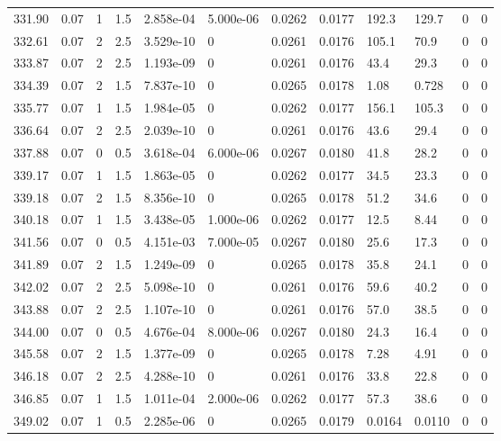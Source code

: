 \documentclass[preview]{standalone}
\begin{document}
{{{{{{\begin{tabular}{L{1.2cm}C{1.2cm} C{0.3cm}C{0.5cm} C{1.4cm}C{1.4cm} C{1.4cm}C{1.4cm} C{1.6cm}C{1.6cm} C{1.6cm}C{1.6cm}}
  331.90  &  0.07  & 1     & 1.5 &  2.858e-04  & 5.000e-06  &  0.0262&   0.0177& 192.3 & 129.7   &  0 & 0  \\ 
  332.61  &  0.07  & 2     & 2.5 &  3.529e-10  & 0  &  0.0261&   0.0176& 105.1 & 70.9   &  0 & 0  \\ 
  333.87  &  0.07  & 2     & 2.5 &  1.193e-09  & 0  &  0.0261&   0.0176& 43.4 & 29.3   &  0 & 0  \\ 
  334.39  &  0.07  & 2     & 1.5 &  7.837e-10  & 0  &  0.0265&   0.0178& 1.08 & 0.728   &  0 & 0  \\ 
  335.77  &  0.07  & 1     & 1.5 &  1.984e-05  & 0  &  0.0262&   0.0177& 156.1 & 105.3   &  0 & 0  \\ 
  336.64  &  0.07  & 2     & 2.5 &  2.039e-10  & 0  &  0.0261&   0.0176& 43.6 & 29.4   &  0 & 0  \\ 
  337.88  &  0.07  & 0     & 0.5 &  3.618e-04  & 6.000e-06  &  0.0267&   0.0180& 41.8 & 28.2   &  0 & 0  \\ 
  339.17  &  0.07  & 1     & 1.5 &  1.863e-05  & 0  &  0.0262&   0.0177& 34.5 & 23.3   &  0 & 0  \\ 
  339.18  &  0.07  & 2     & 1.5 &  8.356e-10  & 0  &  0.0265&   0.0178& 51.2 & 34.6   &  0 & 0  \\ 
  340.18  &  0.07  & 1     & 1.5 &  3.438e-05  & 1.000e-06  &  0.0262&   0.0177& 12.5 & 8.44   &  0 & 0  \\ 
  341.56  &  0.07  & 0     & 0.5 &  4.151e-03  & 7.000e-05  &  0.0267&   0.0180& 25.6 & 17.3   &  0 & 0  \\ 
  341.89  &  0.07  & 2     & 1.5 &  1.249e-09  & 0  &  0.0265&   0.0178& 35.8 & 24.1   &  0 & 0  \\ 
  342.02  &  0.07  & 2     & 2.5 &  5.098e-10  & 0  &  0.0261&   0.0176& 59.6 & 40.2   &  0 & 0  \\ 
  343.88  &  0.07  & 2     & 2.5 &  1.107e-10  & 0  &  0.0261&   0.0176& 57.0 & 38.5   &  0 & 0  \\ 
  344.00  &  0.07  & 0     & 0.5 &  4.676e-04  & 8.000e-06  &  0.0267&   0.0180& 24.3 & 16.4   &  0 & 0  \\ 
  345.58  &  0.07  & 2     & 1.5 &  1.377e-09  & 0  &  0.0265&   0.0178& 7.28 & 4.91   &  0 & 0  \\ 
  346.18  &  0.07  & 2     & 2.5 &  4.288e-10  & 0  &  0.0261&   0.0176& 33.8 & 22.8   &  0 & 0  \\ 
  346.85  &  0.07  & 1     & 1.5 &  1.011e-04  & 2.000e-06  &  0.0262&   0.0177& 57.3 & 38.6   &  0 & 0  \\ 
  349.02  &  0.07  & 1     & 0.5 &  2.285e-06  & 0  &  0.0265&   0.0179& 0.0164 & 0.0110   &  0 & 0  \\ 

\end{tabular}}}}}}}
\end{document}
